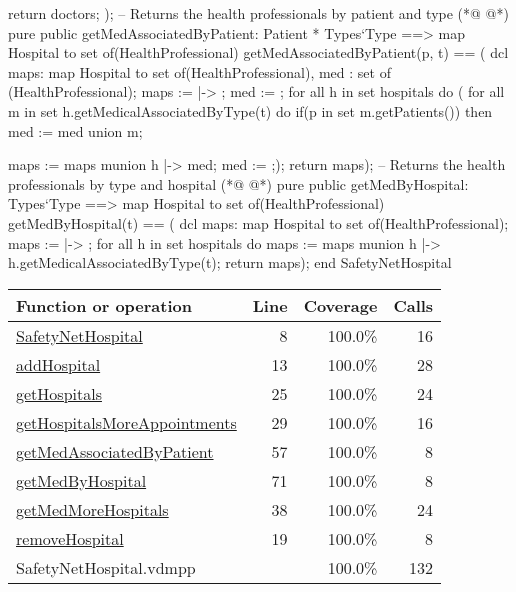 \begin{vdmpp}[breaklines=true]
                  return doctors;
                 );
 -- Returns the health professionals by patient and type                              
(*@
\label{getMedAssociatedByPatient:57}
@*)
 pure public getMedAssociatedByPatient: Patient * Types`Type ==> map Hospital to set of(HealthProfessional)
  getMedAssociatedByPatient(p, t) == (
                     dcl maps: map Hospital to set of(HealthProfessional), med : set of (HealthProfessional);
                     maps := { |-> };
                     med := {};
                     for all h in set hospitals do (
                      for all m in set h.getMedicalAssociatedByType(t) do
                       if(p in set m.getPatients())
                        then med := med union {m};
                       
                      maps := maps munion {h |-> med};
                      med := {};);
                      return maps);
 -- Returns the health professionals by type and hospital
(*@
\label{getMedByHospital:71}
@*)
 pure public getMedByHospital: Types`Type ==> map Hospital to set of(HealthProfessional)
  getMedByHospital(t) == (
                     dcl maps: map Hospital to set of(HealthProfessional);
                     maps := { |-> };
                     for all h in set hospitals do
                      maps := maps munion {h |-> h.getMedicalAssociatedByType(t)};
                     return maps);
end SafetyNetHospital
\end{vdmpp}
\bigskip
\begin{longtable}{|l|r|r|r|}
\hline
Function or operation & Line & Coverage & Calls \\
\hline
\hline
\hyperref[SafetyNetHospital:8]{SafetyNetHospital} & 8&100.0\% & 16 \\
\hline
\hyperref[addHospital:13]{addHospital} & 13&100.0\% & 28 \\
\hline
\hyperref[getHospitals:25]{getHospitals} & 25&100.0\% & 24 \\
\hline
\hyperref[getHospitalsMoreAppointments:29]{getHospitalsMoreAppointments} & 29&100.0\% & 16 \\
\hline
\hyperref[getMedAssociatedByPatient:57]{getMedAssociatedByPatient} & 57&100.0\% & 8 \\
\hline
\hyperref[getMedByHospital:71]{getMedByHospital} & 71&100.0\% & 8 \\
\hline
\hyperref[getMedMoreHospitals:38]{getMedMoreHospitals} & 38&100.0\% & 24 \\
\hline
\hyperref[removeHospital:19]{removeHospital} & 19&100.0\% & 8 \\
\hline
\hline
SafetyNetHospital.vdmpp & & 100.0\% & 132 \\
\hline
\end{longtable}


